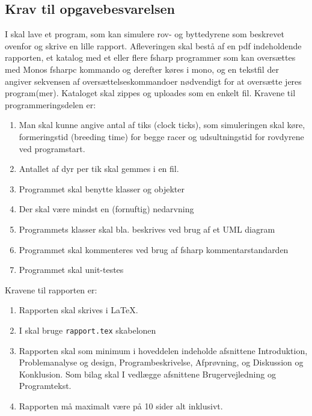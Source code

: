 \documentclass[a4paper,12pt]{article}
\begin{document}
\subsection*{Krav til opgavebesvarelsen}
I skal lave et program, som kan simulere rov- og byttedyrene som beskrevet ovenfor og skrive en lille rapport. Afleveringen skal bestå af en pdf indeholdende rapporten, et katalog med et eller flere fsharp programmer som kan oversættes med Monos fsharpc kommando og derefter køres i mono, og en tekstfil der angiver sekvensen af oversættelseskommandoer nødvendigt for at oversætte jeres program(mer). Kataloget skal zippes og uploades som en enkelt fil. Kravene til programmeringsdelen er:
\begin{enumerate}
\item Man skal kunne angive antal af tiks (clock ticks), som simuleringen skal køre, formeringstid (breeding time) for begge racer og udsultningstid for rovdyrene ved programstart.
\item Antallet af dyr per tik skal gemmes i en fil.
\item Programmet skal benytte klasser og objekter
\item Der skal være mindst en (fornuftig) nedarvning
\item Programmets klasser skal bla. beskrives ved brug af et UML diagram
\item Programmet skal kommenteres ved brug af fsharp kommentarstandarden
\item Programmet skal unit-testes
\end{enumerate}
Kravene til rapporten er:
\begin{enumerate}[resume]
\item Rapporten skal skrives i \LaTeX.
\item I skal bruge \texttt{rapport.tex} skabelonen
\item Rapporten skal som minimum i hoveddelen indeholde afsnittene Introduktion, Problemanalyse og design, Programbeskrivelse, Afprøvning, og Diskussion og Konklusion. Som bilag skal I vedlægge afsnittene Brugervejledning og Programtekst.
\item Rapporten må maximalt være på 10 sider alt inklusivt.
\end{enumerate}
\end{document}
